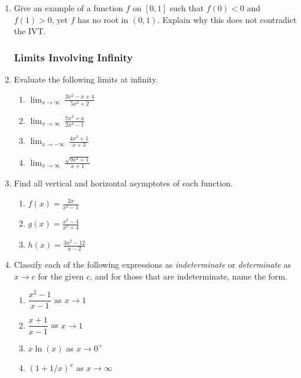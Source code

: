 \begin{enumerate}
\item Give an example of a function $f$ on $[0, 1]$ such that
      $f(0) < 0$ and $f(1) > 0$, yet $f$ has no root in $(0, 1)$.
      Explain why this does not contradict the IVT.

\subsubsection*{Limits Involving Infinity}

\item Evaluate the following limits at infinity.
      \begin{enumerate}
        \item $\displaystyle\lim_{x \to \infty}\ \frac{3x^2 - x + 4}{5x^2 + 2}$
        \item $\displaystyle\lim_{x \to \infty}\ \frac{7x^3 + x}{2x^4 - 1}$
        \item $\displaystyle\lim_{x \to -\infty}\ \frac{4x^2 + 1}{x + 3}$
        \item $\displaystyle\lim_{x \to \infty}\ \frac{\sqrt{9x^2 + 1}}{x + 1}$
      \end{enumerate}

\item Find all vertical and horizontal asymptotes of each function.
      \begin{enumerate}
        \item $\displaystyle f(x) = \frac{2x}{x^2 - 1}$
        \item $\displaystyle g(x) = \frac{x^2 - 4}{x^2 + 4}$
        \item $\displaystyle h(x) = \frac{3x^2 - 12}{x - 2}$
      \end{enumerate}

\item Classify each of the following expressions as
      \emph{indeterminate} or \emph{determinate} as $x \to c$
      for the given $c$, and for those that are indeterminate,
      name the form.
      \begin{enumerate}
        \item $\dfrac{x^2 - 1}{x - 1}$ as $x \to 1$
        \item $\dfrac{x + 1}{x - 1}$ as $x \to 1$
        \item $x \ln(x)$ as $x \to 0^+$
        \item $(1 + 1/x)^x$ as $x \to \infty$
      \end{enumerate}

\end{enumerate}

\clearpage
\fi
